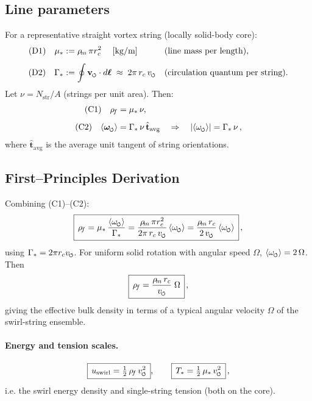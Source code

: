\documentclass[11pt]{article}
\begin{document}
\subsection*{Line parameters}
For a representative straight vortex string (locally solid-body core):
\begin{align}
\text{(D1)}\quad
\mu_* &:= \rhom\,\pi \rc^2
\quad\;[\mathrm{kg/m}]&& \text{(line mass per length)}, \\[1ex]
\text{(D2)}\quad
\Gamma_* &:= \oint \vswirl \cdot d\boldsymbol{\ell}
\;\approx\; 2\pi\,\rc\,\vscore
&& \text{(circulation quantum per string)}.
\end{align}
Let $\nu = N_{\text{str}}/A$ (strings per unit area). Then:
\begin{align}
\text{(C1)}\quad
\rhof &= \mu_*\,\nu, \\[1ex]
\text{(C2)}\quad
\langle \omegas \rangle &= \Gamma_*\,\nu\,\hat{\mathbf{t}}_{\text{avg}} \quad\Rightarrow\quad |\langle \omega_{\swirlarrow}\rangle| = \Gamma_*\,\nu\,,
\end{align}
where $\hat{\mathbf{t}}_{\text{avg}}$ is the average unit tangent of string orientations.

\subsection*{First–Principles Derivation}
Combining (C1)–(C2):
\begin{equation}
\boxed{\,\rhof = \mu_*\,\frac{\langle\omega_{\swirlarrow}\rangle}{\Gamma_*}
    = \frac{\rhom\,\pi \rc^2}{2\pi\,\rc\,\vscore}\,\langle\omega_{\swirlarrow}\rangle
    = \frac{\rhom\,\rc}{2\,\vscore}\,\langle\omega_{\swirlarrow}\rangle\,}\,,
\label{eq:rhof_from_omega}
\end{equation}
using $\Gamma_*=2\pi\rc\vscore$. For uniform solid rotation with angular speed $\Omega$, $\langle\omega_{\swirlarrow}\rangle = 2\,\Omega$. Then
\begin{equation}
\boxed{\,\rhof = \frac{\rhom\,\rc}{\vscore}\;\Omega\,}\,,
\label{eq:rhof_from_Omega}
\end{equation}
giving the effective bulk density in terms of a typical angular velocity $\Omega$ of the swirl-string ensemble.

\paragraph{Energy and tension scales.}
    \[
        \boxed{\,u_{\text{swirl}} = \tfrac{1}{2}\,\rhof\,\vscore^2\,}, \qquad
        \boxed{\,T_* = \tfrac{1}{2}\,\mu_*\,\vscore^2\,}\,,
    \]
    i.e. the swirl energy density and single-string tension (both on the core).
\end{document}
